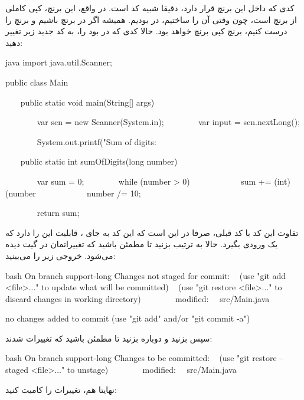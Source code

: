 کدی که داخل این برنچ قرار دارد، دقیقا شبیه کد  است. در
واقع، این برنچ، کپی کاملی از برنچ  است، چون وقتی آن را ساختیم،
در  بودیم. همیشه اگر در برنچ  باشیم و
برنچ  را درست کنیم، برنچ  کپی برنچ
 خواهد بود. حالا کدی که در  بود
را، به کد جدید زیر تغییر دهید:

\begin{codebox}{java}
import java.util.Scanner;

public class Main {
    public static void main(String[] args) {
        var scn = new Scanner(System.in);
        var input = scn.nextLong();  
  
        System.out.printf("Sum of digits: %
    }

    public static int sumOfDigits(long number) {
        var sum = 0;
        while (number > 0) {  
            sum += (int)(number %
            number /= 10;  
        }

        return sum;  
    }  
}
\end{codebox}

تفاوت این کد با کد قبلی، صرفا در این است که این کد به جای
، قابلیت این را دارد که یک  ورودی
بگیرد. حالا به ترتیب  بزنید تا مطمئن باشید که
تغییراتمان در گیت دیده می‌شود. خروجی زیر را می‌بینید:

\begin{codebox}{bash}
On branch support-long  
Changes not staged for commit:  
  (use "git add <file>..." to update what will be committed)  
  (use "git restore <file>..." to discard changes in working directory)  
        modified:   src/Main.java  
  
no changes added to commit (use "git add" and/or "git commit -a")
\end{codebox}

سپس  بزنید و دوباره  بزنید
تا مطمئن باشید که تغییرات  شدند:

\begin{codebox}{bash}
On branch support-long  
Changes to be committed:  
  (use "git restore --staged <file>..." to unstage)  
        modified:   src/Main.java
\end{codebox}

نهایتا هم، تغییرات را کامیت کنید:


